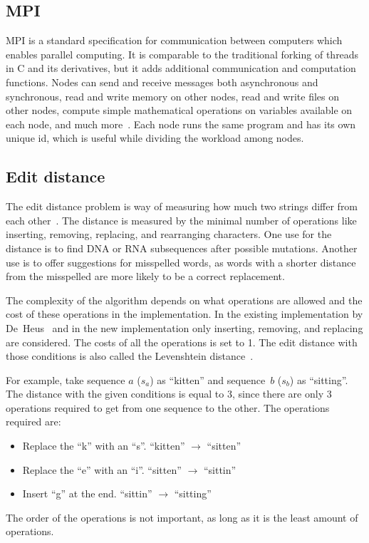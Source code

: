 \subsection{MPI}
MPI is a standard specification for communication between computers which enables parallel computing.
It is comparable to the traditional forking of threads in C and its derivatives, but it adds additional communication and computation functions.
Nodes can send and receive messages both asynchronous and synchronous, read and write memory on other nodes, read and write files on other nodes, compute simple mathematical operations on variables available on each node, and much more~\cite{MPI}.
Each node runs the same program and has its own unique id, which is useful while dividing the workload among nodes.

\subsection{Edit distance}\label{bed}
The edit distance problem is way of measuring how much two strings differ from each other~\cite{Navarro:2001:GTA:375360.375365}.
The distance is measured by the minimal number of operations like inserting, removing, replacing, and rearranging characters.
One use for the distance is to find DNA or RNA subsequences after possible mutations.
Another use is to offer suggestions for misspelled words, as words with a shorter distance from the misspelled are more likely to be a correct replacement.

The complexity of the algorithm depends on what operations are allowed and the cost of these operations in the implementation.
In the existing implementation by De~Heus~\cite{Heus} and in the new implementation only inserting, removing, and replacing are considered.
The costs of all the operations is set to 1.
The edit distance with those conditions is also called the Levenshtein distance~\cite{Navarro:2001:GTA:375360.375365}.

For example, take sequence $a$ ($s_a$) as ``kitten'' and sequence~$b$ ($s_b$) as ``sitting''.
The distance with the given conditions is equal to 3, since there are only 3 operations required to get from one sequence to the other.
The operations required are:
\begin{itemize}
    \item Replace the ``k'' with an ``s''. ``kitten'' $\rightarrow$ ``sitten''
    \item Replace the ``e'' with an ``i''. ``sitten'' $\rightarrow$ ``sittin''
    \item Insert ``g'' at the end. ``sittin'' $\rightarrow$ ``sitting''
\end{itemize}
The order of the operations is not important, as long as it is the least amount of operations.

